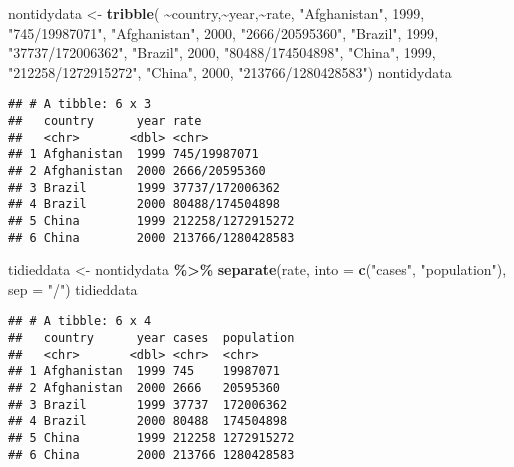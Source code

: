 \documentclass[
]{article}
\newenvironment{Shaded}{\begin{snugshade}}{\end{snugshade}}
\newcommand{\AttributeTok}[1]{\textcolor[rgb]{0.13,0.29,0.53}{#1}}
\newcommand{\DecValTok}[1]{\textcolor[rgb]{0.00,0.00,0.81}{#1}}
\newcommand{\FunctionTok}[1]{\textcolor[rgb]{0.13,0.29,0.53}{\textbf{#1}}}
\newcommand{\NormalTok}[1]{#1}
\newcommand{\OtherTok}[1]{\textcolor[rgb]{0.56,0.35,0.01}{#1}}
\newcommand{\SpecialCharTok}[1]{\textcolor[rgb]{0.81,0.36,0.00}{\textbf{#1}}}
\newcommand{\StringTok}[1]{\textcolor[rgb]{0.31,0.60,0.02}{#1}}
\begin{document}
\begin{Shaded}
\begin{Highlighting}[]
\NormalTok{nontidydata }\OtherTok{\textless{}{-}} \FunctionTok{tribble}\NormalTok{(}
 \SpecialCharTok{\textasciitilde{}}\NormalTok{country,}\SpecialCharTok{\textasciitilde{}}\NormalTok{year,}\SpecialCharTok{\textasciitilde{}}\NormalTok{rate, }
\StringTok{"Afghanistan"}\NormalTok{, }\DecValTok{1999}\NormalTok{, }\StringTok{"745/19987071"}\NormalTok{, }
\StringTok{"Afghanistan"}\NormalTok{, }\DecValTok{2000}\NormalTok{, }\StringTok{"2666/20595360"}\NormalTok{, }
\StringTok{"Brazil"}\NormalTok{, }\DecValTok{1999}\NormalTok{, }\StringTok{"37737/172006362"}\NormalTok{, }
\StringTok{"Brazil"}\NormalTok{, }\DecValTok{2000}\NormalTok{, }\StringTok{"80488/174504898"}\NormalTok{, }
\StringTok{"China"}\NormalTok{, }\DecValTok{1999}\NormalTok{, }\StringTok{"212258/1272915272"}\NormalTok{,}
\StringTok{"China"}\NormalTok{, }\DecValTok{2000}\NormalTok{, }\StringTok{"213766/1280428583"}\NormalTok{)}
\NormalTok{nontidydata}
\end{Highlighting}
\end{Shaded}

\begin{verbatim}
## # A tibble: 6 x 3
##   country      year rate             
##   <chr>       <dbl> <chr>            
## 1 Afghanistan  1999 745/19987071     
## 2 Afghanistan  2000 2666/20595360    
## 3 Brazil       1999 37737/172006362  
## 4 Brazil       2000 80488/174504898  
## 5 China        1999 212258/1272915272
## 6 China        2000 213766/1280428583
\end{verbatim}

\begin{Shaded}
\begin{Highlighting}[]
\NormalTok{tidieddata }\OtherTok{\textless{}{-}}\NormalTok{ nontidydata }\SpecialCharTok{\%\textgreater{}\%}
 \FunctionTok{separate}\NormalTok{(rate, }\AttributeTok{into =} \FunctionTok{c}\NormalTok{(}\StringTok{"cases"}\NormalTok{, }
 \StringTok{"population"}\NormalTok{),}
 \AttributeTok{sep =} \StringTok{"/"}\NormalTok{)}
\NormalTok{tidieddata}
\end{Highlighting}
\end{Shaded}

\begin{verbatim}
## # A tibble: 6 x 4
##   country      year cases  population
##   <chr>       <dbl> <chr>  <chr>     
## 1 Afghanistan  1999 745    19987071  
## 2 Afghanistan  2000 2666   20595360  
## 3 Brazil       1999 37737  172006362 
## 4 Brazil       2000 80488  174504898 
## 5 China        1999 212258 1272915272
## 6 China        2000 213766 1280428583
\end{verbatim}
\end{document}
